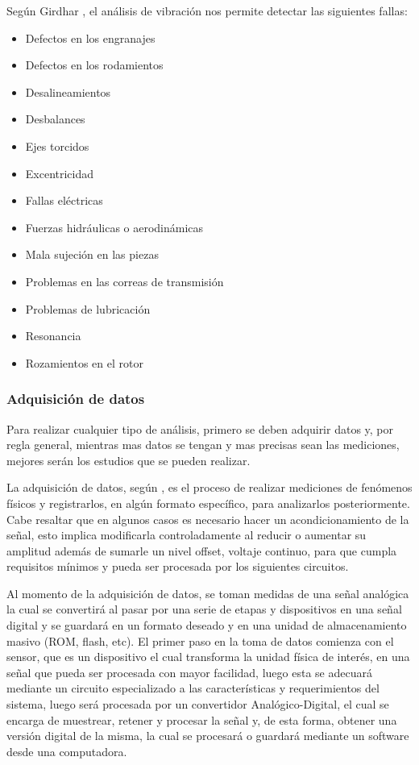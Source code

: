 Según Girdhar \Cite{Girdhar},  el análisis de vibración nos permite detectar las
siguientes fallas:

\begin{itemize}[noitemsep]

\item Defectos en los engranajes
\item Defectos en los rodamientos
\item Desalineamientos
\item Desbalances
\item Ejes torcidos
\item Excentricidad
\item Fallas eléctricas
\item Fuerzas hidráulicas o aerodinámicas
\item Mala sujeción en las piezas
\item Problemas en las correas de transmisión
\item Problemas de lubricación
\item Resonancia
\item Rozamientos en el rotor
\end{itemize}


\subsubsection*{Adquisición de datos}

Para realizar cualquier tipo de análisis, primero se deben adquirir datos y,
por regla general, mientras mas datos se tengan y mas precisas sean las
mediciones, mejores serán los estudios que se pueden realizar.


La adquisición de datos, según \cite{adquisiciondatos}, es el proceso de
realizar mediciones de fenómenos físicos
y registrarlos, en algún formato específico, para analizarlos posteriormente.
Cabe resaltar que en algunos casos es necesario hacer un acondicionamiento de
la señal, esto
implica modificarla controladamente al reducir o aumentar su amplitud además de
sumarle un nivel offset, voltaje continuo, para que cumpla requisitos mínimos
y pueda ser procesada por los siguientes circuitos.

Al momento de la adquisición de datos, se toman medidas de una señal analógica
la cual se convertirá al pasar por una serie de etapas y dispositivos en una
señal digital y se guardará en un formato deseado y en una unidad de
almacenamiento masivo (ROM, flash, etc).
El primer paso en la toma de  datos comienza con el sensor, que es un
dispositivo el cual transforma la unidad física de interés, en una señal que
pueda ser procesada con mayor facilidad, luego esta se adecuará mediante un
circuito especializado a las características y requerimientos del sistema,
luego será procesada por un convertidor Analógico-Digital, el cual se encarga de
muestrear, retener y procesar la señal y, de esta forma, obtener una versión
digital de la misma, la cual se procesará o guardará mediante un software desde
una computadora.

